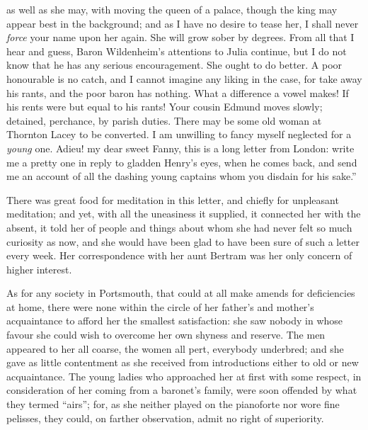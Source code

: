 as well as she may, with moving the queen of a palace,
though the king may appear best in the background;
and as I have no desire to tease her, I shall never \emph{force}
your name upon her again.  She will grow sober by degrees.
From all that I hear and guess, Baron Wildenheim's
attentions to Julia continue, but I do not know that he
has any serious encouragement.  She ought to do better.
A poor honourable is no catch, and I cannot imagine any
liking in the case, for take away his rants, and the poor
baron has nothing.  What a difference a vowel makes!
If his rents were but equal to his rants!  Your cousin
Edmund moves slowly; detained, perchance, by parish duties.
There may be some old woman at Thornton Lacey to be converted.
I am unwilling to fancy myself neglected for a \emph{young} one.
Adieu! my dear sweet Fanny, this is a long letter from London:
write me a pretty one in reply to gladden Henry's eyes,
when he comes back, and send me an account of all the dashing
young captains whom you disdain for his sake.''

There was great food for meditation in this letter,
and chiefly for unpleasant meditation; and yet, with all
the uneasiness it supplied, it connected her with the absent,
it told her of people and things about whom she had never
felt so much curiosity as now, and she would have been
glad to have been sure of such a letter every week.
Her correspondence with her aunt Bertram was her only
concern of higher interest.

As for any society in Portsmouth, that could at all make
amends for deficiencies at home, there were none within
the circle of her father's and mother's acquaintance
to afford her the smallest satisfaction:  she saw nobody
in whose favour she could wish to overcome her own
shyness and reserve.  The men appeared to her all coarse,
the women all pert, everybody underbred; and she gave
as little contentment as she received from introductions
either to old or new acquaintance.  The young ladies who
approached her at first with some respect, in consideration
of her coming from a baronet's family, were soon offended
by what they termed ``airs''; for, as she neither played
on the pianoforte nor wore fine pelisses, they could,
on farther observation, admit no right of superiority.

